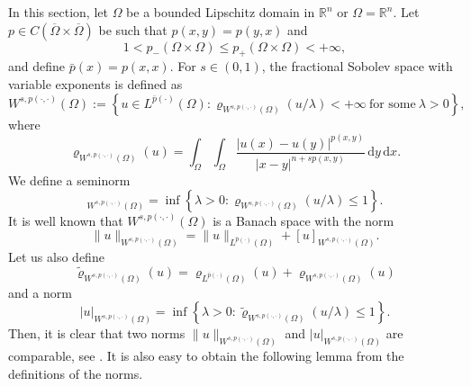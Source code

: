 \documentclass[11pt]{amsart}
\theoremstyle{plain}
\theoremstyle{definition}
\numberwithin{equation}{section}
\begin{document}
In this section, let $\Omega$ be a bounded Lipschitz domain in $\mathbb{R}^n$ or $\Omega = \mathbb{R}^n$. Let $p \in C(\overline{\Omega} \times \overline{\Omega})$ be such that $p(x,y) = p(y,x)$ and
\begin{equation*}
1 < p_-(\Omega \times \Omega) \leq p_+(\Omega \times \Omega) < +\infty,
\end{equation*}
and define $\bar{p}(x) = p(x,x)$. For $s \in (0,1)$, the fractional Sobolev space with variable exponents is defined as
\begin{equation*}
W^{s, p(\cdot,\cdot)}(\Omega) := \left\lbrace u \in L^{\bar{p}(\cdot)}(\Omega): \varrho_{W^{s,p(\cdot,\cdot)}(\Omega)}(u/\lambda) < +\infty ~\text{for some}~ \lambda > 0 \right\rbrace,
\end{equation*}
where
\begin{equation*}
\varrho_{W^{s,p(\cdot,\cdot)}(\Omega)}(u) = \int_{\Omega}\int_{\Omega} \frac{|u(x)-u(y)|^{p(x,y)}}{|x-y|^{n+sp(x,y)}} \,\mathrm{d}y\,\mathrm{d}x.
\end{equation*}
We define a seminorm
\begin{equation*}
[u]_{W^{s,p(\cdot,\cdot)}(\Omega)} = \inf \left\lbrace \lambda > 0: \varrho_{W^{s,p(\cdot,\cdot)}(\Omega)}(u/\lambda) \leq 1 \right\rbrace.
\end{equation*}
It is well known \cite{KRV17} that $W^{s, p(\cdot,\cdot)}(\Omega)$ is a Banach space with the norm
\begin{equation*}
\|u\|_{W^{s,p(\cdot,\cdot)}(\Omega)} = \|u\|_{L^{\bar{p}(\cdot)}(\Omega)} + [u]_{W^{s, p(\cdot, \cdot)}(\Omega)}.
\end{equation*}
Let us also define
\begin{equation*}
\tilde{\varrho}_{W^{s,p(\cdot,\cdot)}(\Omega)}(u) = \varrho_{L^{\bar{p}(\cdot)}(\Omega)}(u) + \varrho_{W^{s,p(\cdot,\cdot)}(\Omega)}(u)
\end{equation*}
and a norm
\begin{equation*}
|u|_{W^{s,p(\cdot,\cdot)}(\Omega)} = \inf \left\lbrace \lambda > 0: \tilde{\varrho}_{W^{s,p(\cdot,\cdot)}(\Omega)}(u/\lambda) \leq 1 \right\rbrace.
\end{equation*}
Then, it is clear that two norms $\|u\|_{W^{s,p(\cdot,\cdot)}(\Omega)}$ and $|u|_{W^{s,p(\cdot,\cdot)}(\Omega)}$ are comparable, see \cite{HK19}. It is also easy to obtain the following lemma from the definitions of the norms.
\end{document}
